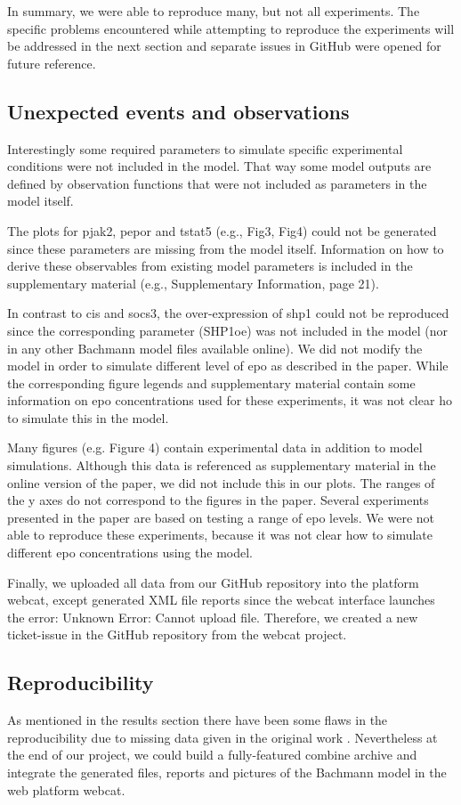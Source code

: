 In summary, we were able to reproduce many, but not all experiments. The specific problems encountered while attempting to reproduce the experiments will be addressed in the next section and separate issues in GitHub were opened for future reference.


\subsection*{Unexpected events and observations}
Interestingly some required parameters to simulate specific experimental conditions were not included in the model. That way some model outputs are defined by observation functions that were not included as parameters in the model itself. 

The plots for \ac{pjak}2, \ac{pepor} and t\ac{stat}5 (e.g., Fig3, Fig4) could not be generated since these parameters are missing from the model itself. Information on how to derive these observables from existing model parameters is included in the supplementary material (e.g., Supplementary Information, page 21). 

In contrast to \ac{cis} and \ac{socs}3, the over-expression of \ac{shp1} could not be reproduced since the corresponding parameter (SHP1oe) was not included in the model (nor in any other Bachmann model files available online). We did not modify the model in order to simulate different level of \ac{epo} as described in the paper. While the corresponding figure legends and supplementary material contain some information on \ac{epo} concentrations used for these experiments, it was not clear ho to simulate this in the model.

Many figures (e.g. Figure 4) contain experimental data in addition to model simulations. Although this data is referenced as supplementary material in the online version of the paper, we did not include this in our plots. The ranges of the y axes do not correspond to the figures in the paper. 
Several experiments presented in the paper are based on testing a range of \ac{epo} levels. We were not able to reproduce these experiments, because it was not clear how to simulate different \ac{epo} concentrations using the model.

Finally, we uploaded all data from our GitHub repository into the platform \ac{webcat}, except generated XML file reports since the \ac{webcat} interface launches the error: \textsf{Unknown Error: Cannot upload file}. Therefore, we created a new ticket-issue in the GitHub repository from the \ac{webcat} project.

\subsection*{Reproducibility}
As mentioned in the results section there have been some flaws in the reproducibility due to missing data given in the original work \cite{bachmannmodel}. Nevertheless at the end of our project, we could build a fully-featured \ac{combine} archive and integrate the generated files, reports and pictures of the Bachmann model in the web platform \ac{webcat}.